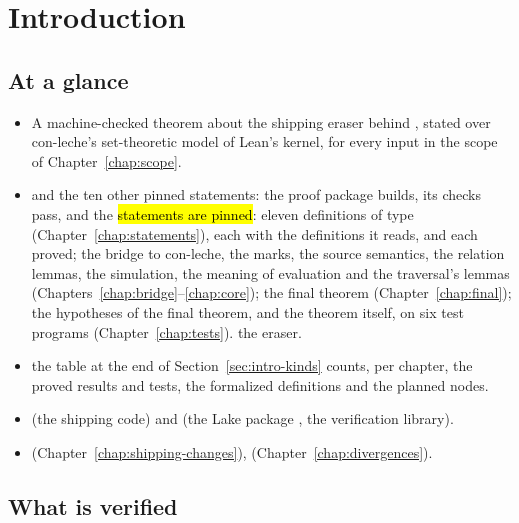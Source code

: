\chapter{Introduction}\label{chap:intro}

\section*{At a glance}
\begin{itemize}
\item {} A machine-checked theorem about the shipping eraser behind ,
  stated over con-leche's set-theoretic model of Lean's kernel, for every input in the scope of
  Chapter~\ref{chap:scope}.
\item {} \stProved{} \hl{} and the ten other pinned statements: the proof package
  builds, its checks pass, and the \hl{statements are pinned}: eleven definitions of type
   (Chapter~\ref{chap:statements}), each with the definitions it reads, and each proved; the bridge to
  con-leche, the marks, the source semantics, the relation lemmas, the simulation, the meaning of evaluation and the traversal's lemmas
  (Chapters~\ref{chap:bridge}--\ref{chap:core}); the final theorem (Chapter~\ref{chap:final}); the hypotheses of the final theorem, and the theorem itself, on six
  test programs (Chapter~\ref{chap:tests}). \stShipping{} the eraser.
\item {} the table at the end of Section~\ref{sec:intro-kinds} counts, per chapter,
  the proved results and tests, the formalized definitions and the planned nodes.
\item {}  (the shipping code) and  (the
  Lake package , the verification library).
\item {}  (Chapter~\ref{chap:shipping-changes}),  (Chapter~\ref{chap:divergences}).
\end{itemize}

\section{What is verified}\label{sec:intro-what}

